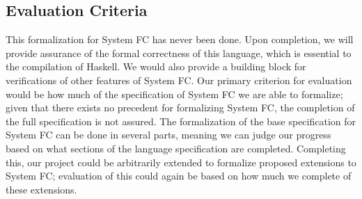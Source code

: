 \documentclass{sig-alternate}
\begin{document}
\subsection{Evaluation Criteria}
\label{subsec:eval_criteria}
This formalization for System FC has never been done. Upon completion, we will provide assurance of the formal correctness of this language, which is essential to the compilation of Haskell. We would also provide a building block for verifications of other features of System FC.
Our primary criterion for evaluation would be how much of the specification of System FC we are able to formalize; given that there exists no precedent for formalizing System FC, the completion of the full specification is not assured. The formalization of the base specification for System FC can be done in several parts, meaning we can judge our progress based on what sections of the language specification are completed. Completing this, our project could be arbitrarily extended to formalize proposed extensions to System FC; evaluation of this could again be based on how much we complete of these extensions.
\end{document}
